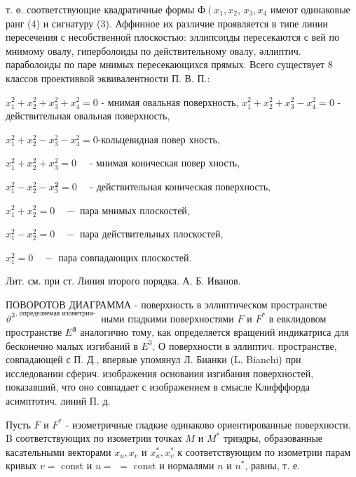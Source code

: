 \documentclass[10pt]{article}
\begin{document}
т. ө. соответствующие квадратичные формы $Ф\left(x_{1}, x_{2}\right.$, $x_{3}, x_{4}$ имеют одинаковые ранг (4) и сигнатуру (3). Аффинное их различие проявляется в типе линии пересечения с несобственной плоскостью: эллипсопды пересекаются с вей по мнимому овалу, гиперболоиды по действительному овалу, әллиптич. параболоиды по паре мнимых пересекающихся прямых. Всего существует 8 классов проективвой эквивалентности П. В. П.:



$x_{1}^{2}+x_{2}^{2}+x_{3}^{2}+x_{4}^{2}=0$ - мнимая овальная поверхность, $x_{1}^{2}+x_{2}^{2}+x_{3}^{2}-x_{4}^{2}=0$ - действительная овальная поверхность,



$x_{1}^{2}+x_{2}^{2}-x_{3}^{2}-x_{4}^{2}=0$-кольцевидная повер хность,



$x_{1}^{2}+x_{2}^{2}+x_{3}^{2}=0 \quad$ - мнимая коническая повер хность,



$x_{1}^{2}-x_{2}^{2}-x_{3}^{\mathbf{2}}=0 \quad$ - действительная коническая поверхность,



$x_{1}^{2}+x_{2}^{2}=0 \quad-$ пара мнимых плоскостей,



$x_{1}^{2}-x_{2}^{2}=0 \quad-$ пара действительных плоскостей,



$x_{1}^{2}=0 \quad-$ пара совпадающих плоскостей.



Лит. см. при ст. Линия второго порядка. А. Б. Иванов.



ПОВОРОТОВ ДИАГРАММА - поверхность в эллиптическом пространстве ${\vartheta^{3}}^{\text {, определяемая изометрич- }}$ ными гладкими поверхностями $F$ и $F^{*}$ в евклидовом пространстве $E^{\mathbf{3}}$ аналогично тому, как определяется вращений индикатриса для бесконечно малых изгибаний в $E^{3}$. О поверхности в эллиптич. пространстве, совпадающей с П. Д., впервые упомянул Л. Бианки (L. Bianchi) при исследовании сферич. изображения основания изгибания поверхностей, показавший, что оно совпадает с изображением в смысле Клифффорда асимптотич. линий П. д.



Пусть $F$ и $F^{*}$ - изометричные гладкие одинаково ориентированные поверхности. B соответствующих по изометрии точках $M$ и $M^{*}$ триэдры, образованные касательными векторами $x_{u}, x_{v}$ и $x_{u}^{*}, x_{v}^{*}$ к соответствующим по изометрии парам кривых $v=$ const и $u=$ $=$ const и нормалями $n$ и $n^{*}$, равны, т. е.
\end{document}
